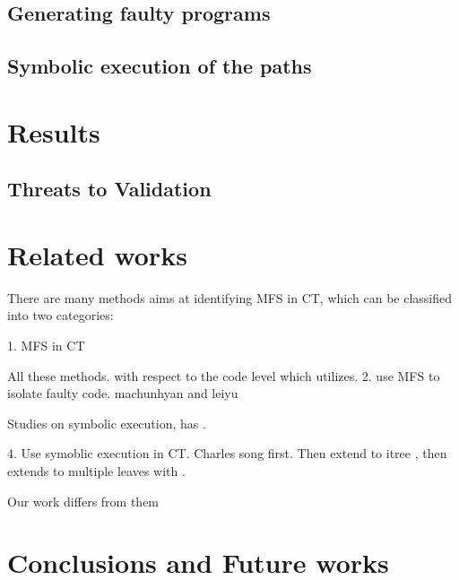 \documentclass{sig-alternate-05-2015}
\begin{document}
\subsection{Generating faulty programs}

\subsection{Symbolic execution of the paths}



\section{Results}\label{sec:results}



\subsection{Threats to Validation}


\section{Related works}\label{sec:related}

There are many methods aims at identifying MFS in CT, which can be classified into two categories:



1. MFS in CT


All these methods. with respect to the code level which utilizes.
2. use MFS to isolate faulty code. machunhyan \cite{ma2013locating}  and leiyu \cite{ghandehari2013fault}


Studies on symbolic execution, has .

4. Use symoblic execution in CT. Charles song \cite{reisner2010using} first. Then extend to itree \cite{song2012itree}, then extends to multiple leaves with \cite{song2014itree}.

Our work differs from them

\section{Conclusions and Future works}\label{sec:conclusion}

\end{document}
